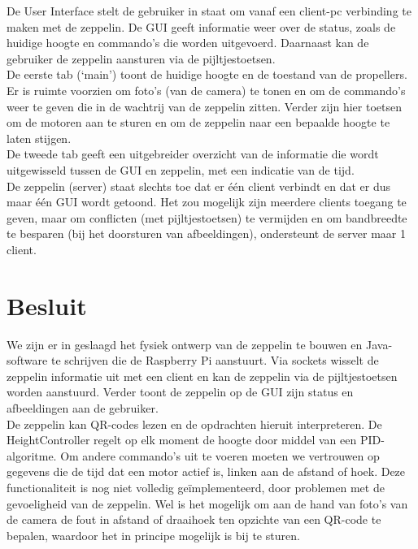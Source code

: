 \documentclass[eind]{penoverslag}
\begin{document}
De User Interface stelt de gebruiker in staat om vanaf een client-pc verbinding te maken met de zeppelin. De GUI geeft informatie weer over de status, zoals de huidige hoogte en commando's die worden uitgevoerd. Daarnaast kan de gebruiker de zeppelin aansturen via de pijltjestoetsen. \\

De eerste tab (`main') toont de huidige hoogte en de toestand van de propellers. Er is ruimte voorzien om foto's (van de camera) te tonen en om de commando's weer te geven die in de wachtrij van de zeppelin zitten. Verder zijn hier toetsen om de motoren aan te sturen en om de zeppelin naar een bepaalde hoogte te laten stijgen.\\

De tweede tab geeft een uitgebreider overzicht van de informatie die wordt uitgewisseld tussen de GUI en zeppelin, met een indicatie van de tijd. \\

De zeppelin (server) staat slechts toe dat er \'e\'en client verbindt en dat er dus maar \'e\'en GUI wordt getoond. Het zou mogelijk zijn meerdere clients toegang te geven, maar om conflicten (met pijltjestoetsen) te vermijden en om bandbreedte te besparen (bij het doorsturen van afbeeldingen), ondersteunt de server maar 1 client. \\




\section{Besluit}
We zijn er in geslaagd het fysiek ontwerp van de zeppelin te bouwen en Java-software te schrijven die de Raspberry Pi aanstuurt. Via sockets wisselt de zeppelin informatie uit met een client en kan de zeppelin via de pijltjestoetsen worden aanstuurd. Verder toont de zeppelin op de GUI zijn status en afbeeldingen aan de gebruiker. \\

De zeppelin kan QR-codes lezen en de opdrachten hieruit interpreteren. De HeightController regelt op elk moment de hoogte door middel van een PID-algoritme. Om andere commando's uit te voeren moeten we vertrouwen op gegevens die de tijd dat een motor actief is, linken aan de afstand of hoek. Deze functionaliteit is nog niet volledig ge\"implementeerd, door problemen met de gevoeligheid van de zeppelin. Wel is het mogelijk om aan de hand van foto's van de camera de fout in afstand of draaihoek ten opzichte van een QR-code te bepalen, waardoor het in principe mogelijk is bij te sturen. \\
\end{document}
